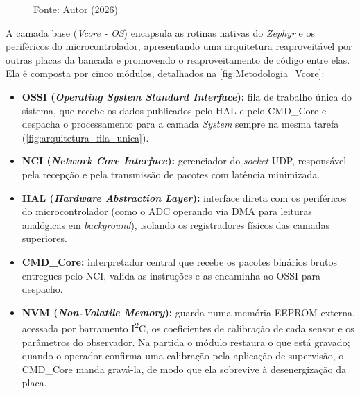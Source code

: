 \begin{figure}[H]

    Fonte: Autor (2026)
\end{figure}

A camada base (\textit{Vcore - OS}) encapsula as rotinas nativas do
\textit{Zephyr} e os periféricos do microcontrolador, apresentando uma
arquitetura reaproveitável por outras placas da bancada e promovendo o
reaproveitamento de código entre elas. Ela é composta por cinco módulos, detalhados na
\autoref{fig:Metodologia_Vcore}:

\begin{itemize}
    \item \textbf{OSSI (\textit{Operating System Standard Interface}):} fila de trabalho única do sistema, que recebe os dados publicados pelo HAL e pelo CMD\_Core e despacha o processamento para a camada \textit{System} sempre na mesma tarefa (\autoref{fig:arquitetura_fila_unica}).
    \item \textbf{NCI (\textit{Network Core Interface}):} gerenciador do \textit{socket} UDP, responsável pela recepção e pela transmissão de pacotes com latência minimizada.
    \item \textbf{HAL (\textit{Hardware Abstraction Layer}):} interface direta com os periféricos do microcontrolador (como o ADC operando via DMA para leituras analógicas em \textit{background}), isolando os registradores físicos das camadas superiores.
    \item \textbf{CMD\_Core:} interpretador central que recebe os pacotes binários brutos entregues pelo NCI, valida as instruções e as encaminha ao OSSI para despacho.
    \item \textbf{NVM (\textit{Non-Volatile Memory}):} guarda numa memória EEPROM externa, acessada por barramento I\textsuperscript{2}C, os coeficientes de calibração de cada sensor e os parâmetros do observador. Na partida o módulo restaura o que está gravado; quando o operador confirma uma calibração pela aplicação de supervisão, o CMD\_Core manda gravá-la, de modo que ela sobrevive à desenergização da placa.
\end{itemize}

